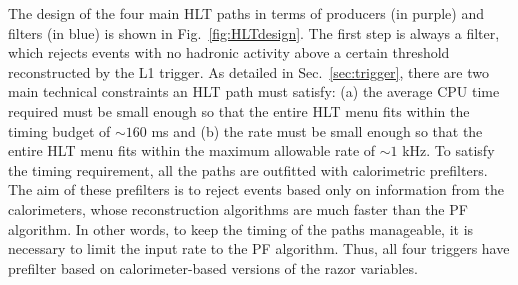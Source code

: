 The design of the four main HLT paths in terms of producers (in
purple) and filters (in blue) is shown
in Fig.~\ref{fig:HLTdesign}. The first step is always a filter, which
rejects events with no hadronic activity above a certain threshold reconstructed by the L1 trigger.
As detailed in Sec.~\ref{sec:trigger}, there are two main technical
constraints an HLT path must satisfy: (a) the average CPU time required must be
small enough so that the entire HLT menu fits within the timing budget
 of $\sim160$ \unit{ms} and (b) the rate must
be small enough so that the entire HLT menu fits within the maximum
allowable rate  of $\sim1$ \unit{kHz}. To satisfy the timing
requirement, all the paths are outfitted with
calorimetric prefilters. The aim of these prefilters is to reject
events based only on information from the calorimeters, whose
reconstruction algorithms are much faster than the PF algorithm. In
other words, to keep the timing of the paths manageable, it is
necessary to limit the input rate to the PF algorithm. Thus, all four
triggers have prefilter based on calorimeter-based versions of the razor
variables.

